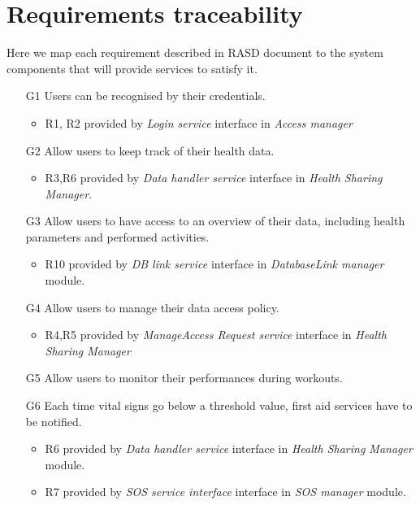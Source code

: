 \documentclass[DD.tex]{subfiles}
\begin{document}
\section{Requirements traceability}
Here we map each requirement described in RASD document to the system components that will provide services to satisfy it.

\begin{itemize}	

	\item [G1] Users can be recognised by their credentials.
	\begin{itemize}
		\item R1, R2 provided by \textit{Login service} interface in \textit{Access manager}
	\end{itemize} 

	\item [G2] Allow users to keep track of their health data.	
	\begin{itemize}
		\item R3,R6 provided by \textit{Data handler service} interface in \textit{Health Sharing Manager}. 
	\end{itemize}
	
	\item [G3] Allow users to have access to an overview of their 
	data, including health parameters and performed activities.
	\begin{itemize}
		\item R10 provided by \textit{DB link service} interface in \textit{DatabaseLink manager} module.
	\end{itemize}
	
	\item [G4] Allow users to manage their data access policy.
	\begin{itemize}
		\item R4,R5 provided by \textit{ManageAccess Request service} interface in \textit{Health Sharing Manager}
	\end{itemize}
	
	\item [G5] Allow users to monitor their performances during 
	workouts.	

	
	\item [G6] Each time vital signs go below a threshold value, first 
	aid services have to be notified.
	\begin{itemize}
		\item R6 provided by \textit{Data handler service} interface in \textit{Health Sharing Manager} module.
		\item R7 provided by \textit{SOS service interface} interface in \textit{SOS manager} module. 
	\end{itemize}
		

\end{itemize}
\end{document}
